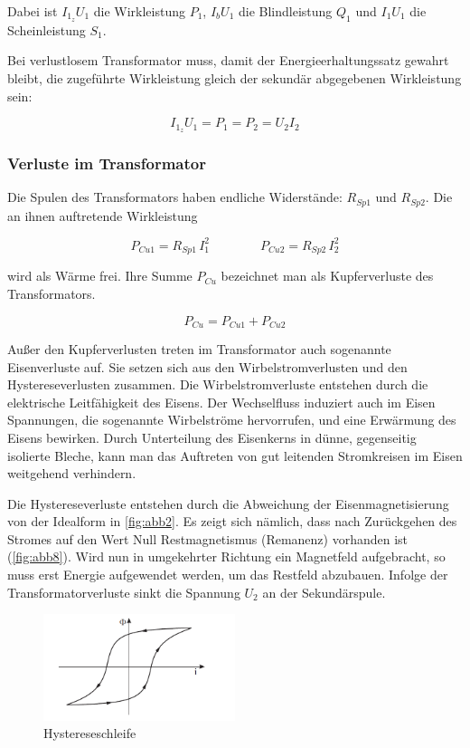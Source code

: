 \documentclass[11pt,ngerman]{scrartcl}
\begin{document}
Dabei ist $I_{1_z} U_1$ die Wirkleistung $P_1$, $I_b U_1$ die Blindleistung $Q_1$ und $I_1 U_1$ die Scheinleistung $S_1$.

Bei verlustlosem Transformator muss, damit der Energieerhaltungssatz gewahrt bleibt, die zugeführte Wirkleistung gleich der sekundär abgegebenen Wirkleistung sein:

\begin{equation}
	I_{1_z} U_1 = P_1 = P_2 = U_2 I_2
\end{equation}

\subsubsection{Verluste im Transformator}

Die Spulen des Transformators haben endliche Widerstände: $R_{Sp1}$ und $R_{Sp2}$. Die an ihnen auftretende
Wirkleistung

\begin{equation}
	P_{Cu1} = R_{Sp1} \, I_1^2 \qquad \qquad P_{Cu2} = R_{Sp2} \, I_2^2
\end{equation}

wird als Wärme frei. Ihre Summe $P_{Cu}$ bezeichnet man als Kupferverluste des Transformators.

\begin{equation}
	P_{Cu} = P_{Cu1} + P_{Cu2}
\end{equation}

Außer den Kupferverlusten treten im Transformator auch sogenannte Eisenverluste auf. Sie
setzen sich aus den Wirbelstromverlusten und den Hystereseverlusten zusammen. Die Wirbelstromverluste
entstehen durch die elektrische Leitfähigkeit des Eisens. Der Wechselfluss induziert
auch im Eisen Spannungen, die sogenannte Wirbelströme hervorrufen, und eine Erwärmung des
Eisens bewirken. Durch Unterteilung des Eisenkerns in dünne, gegenseitig isolierte Bleche, kann
man das Auftreten von gut leitenden Stromkreisen im Eisen weitgehend verhindern.

Die Hystereseverluste entstehen durch die Abweichung der Eisenmagnetisierung von der Idealform
in \autoref{fig:abb2}. Es zeigt sich nämlich, dass nach Zurückgehen des Stromes auf den Wert Null
Restmagnetismus (Remanenz) vorhanden ist (\autoref{fig:abb8}). Wird nun in umgekehrter Richtung ein
Magnetfeld aufgebracht, so muss erst Energie aufgewendet werden, um das Restfeld abzubauen.
Infolge der Transformatorverluste sinkt die Spannung $U_2$ an der Sekundärspule.

\begin{figure}[H]
	\begin{center}
		\includegraphics[width=0.5\textwidth]{abb8}
	\end{center}
	\caption{Hystereseschleife}
	\label{fig:abb8}
\end{figure}
\end{document}
